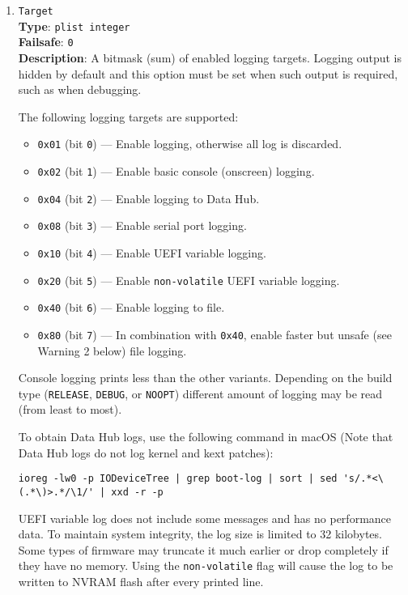 \documentclass[]{article}
\providecommand{\tightlist}{%
  \setlength{\itemsep}{0pt}\setlength{\parskip}{0pt}}
\begin{document}
\begin{enumerate}
\item
  \texttt{Target}\\
  \textbf{Type}: \texttt{plist\ integer}\\
  \textbf{Failsafe}: \texttt{0}\\
  \textbf{Description}: A bitmask (sum) of enabled logging targets.
  Logging output is hidden by default and this option must be set
  when such output is required, such as when debugging.

  The following logging targets are supported:

  \begin{itemize}
  \tightlist
    \item \texttt{0x01} (bit \texttt{0}) --- Enable logging, otherwise all log is discarded.
    \item \texttt{0x02} (bit \texttt{1}) --- Enable basic console (onscreen) logging.
    \item \texttt{0x04} (bit \texttt{2}) --- Enable logging to Data Hub.
    \item \texttt{0x08} (bit \texttt{3}) --- Enable serial port logging.
    \item \texttt{0x10} (bit \texttt{4}) --- Enable UEFI variable logging.
    \item \texttt{0x20} (bit \texttt{5}) --- Enable \texttt{non-volatile} UEFI variable logging.
    \item \texttt{0x40} (bit \texttt{6}) --- Enable logging to file.
    \item \texttt{0x80} (bit \texttt{7}) --- In combination with \texttt{0x40}, enable faster but unsafe (see Warning 2 below) file logging.
  \end{itemize}

  Console logging prints less than the other variants.
  Depending on the build type (\texttt{RELEASE}, \texttt{DEBUG}, or
  \texttt{NOOPT}) different amount of logging may be read (from least to most).

  To obtain Data Hub logs, use the following command in macOS
  (Note that Data Hub logs do not log kernel and kext patches):
\begin{lstlisting}[label=dhublog, style=ocbash]
ioreg -lw0 -p IODeviceTree | grep boot-log | sort | sed 's/.*<\(.*\)>.*/\1/' | xxd -r -p
\end{lstlisting}

  UEFI variable log does not include some messages and has no performance data. To maintain system
  integrity, the log size is limited to 32 kilobytes. Some types of firmware may truncate it much
  earlier or drop completely if they have no memory. Using the \texttt{non-volatile} flag will cause
  the log to be written to NVRAM flash after every printed line.


\end{enumerate}
\end{document}
